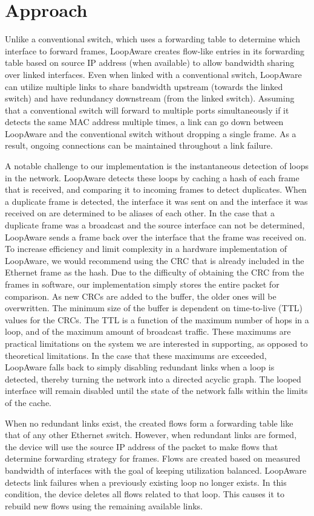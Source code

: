 \section{Approach}
\label{sec:approach}
    Unlike a conventional switch, which uses a forwarding table to determine which interface to forward frames, LoopAware creates flow-like entries in its forwarding table based on source IP address (when available) to allow bandwidth sharing over linked interfaces.
    Even when linked with a conventional switch, LoopAware can utilize multiple links to share bandwidth upstream (towards the linked switch) and have redundancy downstream (from the linked switch).
    Assuming that a conventional switch will forward to multiple ports simultaneously if it detects the same MAC address multiple times, a link can go down between LoopAware and the conventional switch without dropping a single frame.
    As a result, ongoing connections can be maintained throughout a link failure.

    A notable challenge to our implementation is the instantaneous detection of loops in the network.
    LoopAware detects these loops by caching a hash of each frame that is received, and comparing it to incoming frames to detect duplicates.
    When a duplicate frame is detected, the interface it was sent on and the interface it was received on are determined to be aliases of each other.
    In the case that a duplicate frame was a broadcast and the source interface can not be determined, LoopAware sends a frame back over the interface that the frame was received on.
    To increase efficiency and limit complexity in a hardware implementation of LoopAware, we would recommend using the CRC that is already included in the Ethernet frame as the hash.
    Due to the difficulty of obtaining the CRC from the frames in software, our implementation simply stores the entire packet for comparison.
    As new CRCs are added to the buffer, the older ones will be overwritten.
    The minimum size of the buffer is dependent on time-to-live (TTL) values for the CRCs.
    The TTL is a function of the maximum number of hops in a loop, and of the maximum amount of broadcast traffic.
    These maximums are practical limitations on the system we are interested in supporting, as opposed to theoretical limitations.
    In the case that these maximums are exceeded, LoopAware falls back to simply disabling redundant links when a loop is detected, thereby turning the network into a directed acyclic graph.
    The looped interface will remain disabled until the state of the network falls within the limits of the cache.
    
    When no redundant links exist, the created flows form a forwarding table like that of any other Ethernet switch.
    However, when redundant links are formed, the device will use the source IP address of the packet to make flows that determine forwarding strategy for frames.
    Flows are created based on measured bandwidth of interfaces with the goal of keeping utilization balanced.
    LoopAware detects link failures when a previously existing loop no longer exists.
    In this condition, the device deletes all flows related to that loop.
    This causes it to rebuild new flows using the remaining available links.
